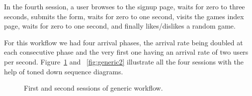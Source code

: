In the fourth session, a user browses to the signup page, waits for zero to three seconds, submits the form, waits for zero to one second, visits the games index page, waits for zero to one second, and finally likes/dislikes a random game.

For this workflow we had four arrival phases, the arrival rate being doubled at each consecutive phase and the very first one having an arrival rate of two users per second. Figure~\ref{fig:generic1} and ~\ref{fig:generic2} illustrate all the four sessions with the help of toned down sequence diagrams.

\begin{figure}

\caption{First and second sessions of generic workflow.}\label{fig:generic1}
\end{figure}


